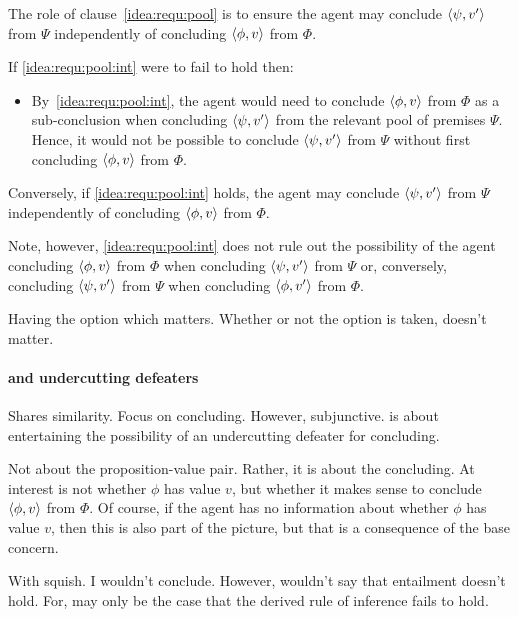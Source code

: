 \begin{note}
  The role of clause~\ref{idea:requ:pool} is to ensure the agent may conclude \(\langle \psi, v' \rangle\) from \(\Psi\) independently of concluding \(\langle \phi, v \rangle\) from \(\Phi\).

  If \ref{idea:requ:pool:int} were to fail to hold then:
  \begin{itemize}
  \item
    By~\ref{idea:requ:pool:int}, the agent would need to conclude \(\langle \phi, v \rangle\) from \(\Phi\) as a sub-conclusion when concluding \(\langle \psi, v' \rangle\) from the relevant pool of premises \(\Psi\).
    Hence, it would not be possible to conclude \(\langle \psi, v' \rangle\) from \(\Psi\) without first concluding \(\langle \phi, v \rangle\) from \(\Phi\).
  \end{itemize}

  Conversely, if \ref{idea:requ:pool:int} holds, the agent may conclude \(\langle \psi, v' \rangle\) from \(\Psi\) independently of concluding \(\langle \phi, v \rangle\) from \(\Phi\).

  Note, however, \ref{idea:requ:pool:int} does not rule out the possibility of the agent concluding \(\langle \phi, v \rangle\) from \(\Phi\) when concluding \(\langle \psi, v' \rangle\) from \(\Psi\) or, conversely, concluding \(\langle \psi, v' \rangle\) from \(\Psi\) when concluding \(\langle \phi, v' \rangle\) from \(\Phi\).

  Having the option which matters.
  Whether or not the option is taken, doesn't matter.
\end{note}

\paragraph{ and undercutting defeaters}

\begin{note}
  Shares similarity.
  Focus on concluding.
  However, subjunctive.
  \qzS{} is about entertaining the possibility of an undercutting defeater for concluding.
\end{note}

\begin{note}
  Not about the proposition-value pair.
  Rather, it is about the concluding.
  At interest is not whether \(\phi\) has value \(v\), but whether it makes sense to conclude \(\langle \phi, v \rangle\) from \(\Phi\).
  Of course, if the agent has no information about whether \(\phi\) has value \(v\), then this is also part of the picture, but that is a consequence of the base concern.

  With squish.
  I wouldn't conclude.
  However, wouldn't say that entailment doesn't hold.
  For, may only be the case that the derived rule of inference fails to hold.
\end{note}

